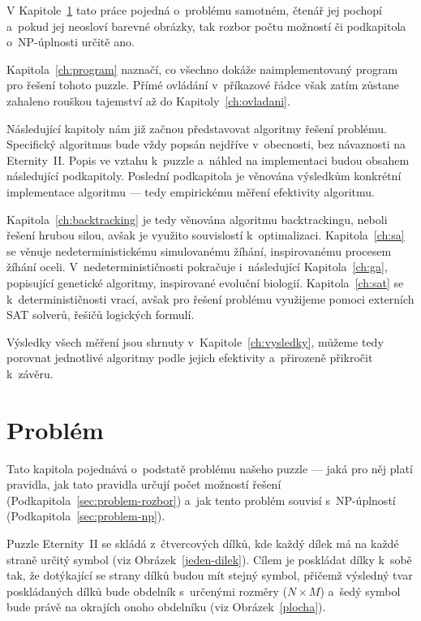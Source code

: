 \documentclass[11pt, titlepage]{report}
\begin{document}
V Kapitole~\ref{ch:problem} tato práce pojedná o~problému samotném, čtenář jej pochopí a~pokud jej neosloví barevné obrázky, tak rozbor počtu možností či podkapitola o~NP-úplnosti určitě ano.

Kapitola~\ref{ch:program} naznačí, co všechno dokáže naimplementovaný program pro řešení tohoto puzzle. Přímé ovládání v~příkazové řádce však zatím zůstane zahaleno rouškou tajemství až do Kapitoly~\ref{ch:ovladani}.

Následující kapitoly nám již začnou představovat algoritmy řešení problému. Specifický algoritmus bude vždy popsán nejdříve v~obecnosti, bez návaznosti na Eternity~II. Popis ve vztahu k~puzzle a~náhled na implementaci budou obsahem následující podkapitoly. Poslední podkapitola je věnována výsledkům konkrétní implementace algoritmu --- tedy empirickému měření efektivity algoritmu.

Kapitola~\ref{ch:backtracking} je tedy věnována algoritmu backtrackingu, neboli řešení hrubou silou, avšak je využito souvislostí k~optimalizaci. Kapitola~\ref{ch:sa} se věnuje nedeterministickému simulovanému žíhání, inspirovanému procesem žíhání oceli. V~nedeterminističnosti pokračuje i~následující Kapitola~\ref{ch:ga}, popisující genetické algoritmy, inspirované evoluční biologií. Kapitola~\ref{ch:sat} se k~determinističnosti vrací, avšak pro řešení problému využijeme pomoci externích SAT solverů, řešičů logických formulí.

Výsledky všech měření jsou shrnuty v~Kapitole~\ref{ch:vysledky}, můžeme tedy porovnat jednotlivé algoritmy podle jejich efektivity a~přirozeně přikročit k~závěru.


\chapter{Problém}
\label{ch:problem}

Tato kapitola pojednává o~podstatě problému našeho puzzle --- jaká pro něj platí pravidla, jak tato pravidla určují počet možností řešení (Podkapitola~\ref{sec:problem-rozbor}) a~jak tento problém souvisí s~NP-úplností (Podkapitola~\ref{sec:problem-np}). 

Puzzle Eternity~II se skládá z~čtvercových dílků, kde každý dílek má na každé straně určitý symbol (viz Obrázek~\ref{jeden-dilek}). Cílem je poskládat dílky k~sobě tak, že dotýkající se strany dílků budou mít stejný symbol, přičemž výsledný tvar poskládaných dílků bude obdelník s~určenými rozměry ($N \times M$) a~šedý symbol bude právě na okrajích onoho obdelníku (viz Obrázek~\ref{plocha}).
\end{document}
